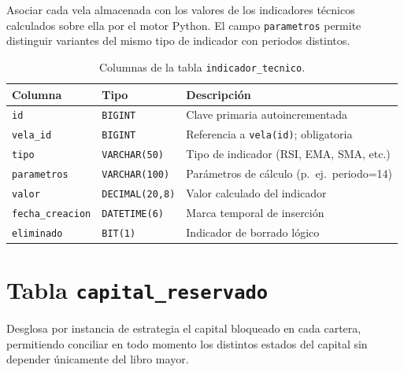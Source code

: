 Asociar cada vela almacenada con los valores de los indicadores técnicos calculados sobre ella por el motor Python. El campo \texttt{parametros} permite distinguir variantes del mismo tipo de indicador con periodos distintos.

\begin{table}[h]
\centering
\caption{Columnas de la tabla \texttt{indicador\_tecnico}.}
\label{tab:sql-indicador}
\begin{tabular}{@{}llp{6.5cm}@{}}
\toprule
\textbf{Columna} & \textbf{Tipo} & \textbf{Descripción} \\
\midrule
\texttt{id}             & \texttt{BIGINT}        & Clave primaria autoincrementada \\
\texttt{vela\_id}       & \texttt{BIGINT}        & Referencia a \texttt{vela(id)}; obligatoria \\
\texttt{tipo}           & \texttt{VARCHAR(50)}   & Tipo de indicador (RSI, EMA, SMA, etc.) \\
\texttt{parametros}     & \texttt{VARCHAR(100)}  & Parámetros de cálculo (p.\ ej.\ periodo=14) \\
\texttt{valor}          & \texttt{DECIMAL(20,8)} & Valor calculado del indicador \\
\texttt{fecha\_creacion}& \texttt{DATETIME(6)}   & Marca temporal de inserción \\
\texttt{eliminado}      & \texttt{BIT(1)}        & Indicador de borrado lógico \\
\bottomrule
\end{tabular}
\end{table}

\section*{Tabla \texttt{capital\_reservado}}

Desglosa por instancia de estrategia el capital bloqueado en cada cartera, permitiendo conciliar en todo momento los distintos estados del capital sin depender únicamente del libro mayor.

